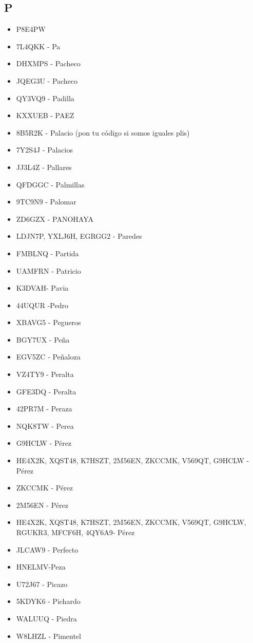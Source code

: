 \subsection*{P}
\begin{itemize}[leftmargin=*,nosep]
\item P8E4PW
\item 7L4QKK - Pa
\item DHXMPS  -  Pacheco
\item JQEG3U - Pacheco
\item QY3VQ9  -  Padilla
\item KXXUEB - PAEZ
\item 8B5R2K - Palacio (pon tu código si somos iguales plis)
\item 7Y2S4J  -  Palacios
\item JJ3L4Z - Pallares
\item QFDGGC - Palmillas
\item 9TC9N9 - Palomar
\item ZD6GZX - PANOHAYA
\item LDJN7P, YXLJ6H, EGRGG2 - Paredes
\item FMBLNQ  -  Partida
\item UAMFRN - Patricio
\item K3DVAH- Pavia
\item 44UQUR   -Pedro
\item XBAVG5 - Pegueros
\item BGY7UX - Peña
\item EGV5ZC - Peñaloza
\item VZ4TY9 - Peralta
\item GFE3DQ - Peralta
\item 42PR7M - Peraza
\item NQK8TW - Perea
\item G9HCLW - Pérez
\item HE4X2K, XQST48, K7HSZT, 2M56EN, ZKCCMK, V569QT, G9HCLW - Pérez
\item ZKCCMK  -  Pérez
\item 2M56EN  -  Pérez
\item HE4X2K, XQST48, K7HSZT, 2M56EN, ZKCCMK, V569QT, G9HCLW, RGUKR3, MFCF6H, 4QY6A9- Pérez
\item JLCAW9   - Perfecto
\item HNELMV-Peza
\item U72J67 - Picazo
\item 5KDYK6 - Pichardo
\item WALUUQ  -  Piedra
\item W8LHZL  -  Pimentel

\end{itemize}
